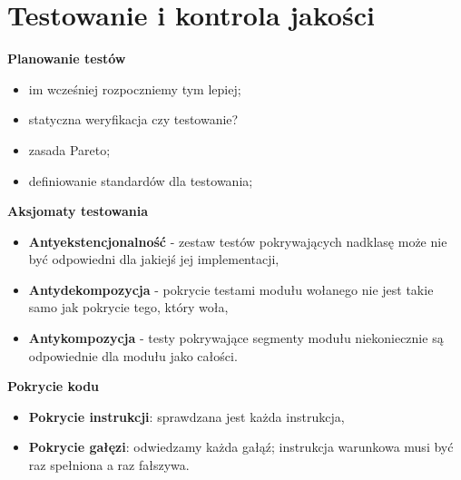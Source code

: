 \documentclass[a4paper]{article}
\begin{document}
    \section{Testowanie i kontrola jakości}

    \textbf{Planowanie testów}
    \begin{itemize}
        \item im wcześniej rozpoczniemy tym lepiej;
        \item statyczna weryfikacja czy testowanie?
        \item zasada Pareto;
        \item definiowanie standardów dla testowania;
    \end{itemize}

    \textbf{Aksjomaty testowania}
    \begin{itemize}
        \item \textbf{Antyekstencjonalność} - zestaw testów pokrywających nadklasę może nie być odpowiedni
        dla jakiejś jej implementacji,
        \item \textbf{Antydekompozycja} - pokrycie testami modułu wołanego nie jest takie samo
        jak pokrycie tego, który woła,
        \item \textbf{Antykompozycja} - testy pokrywające segmenty modułu niekoniecznie są odpowiednie
        dla modułu jako całości.
    \end{itemize}


    \textbf{Pokrycie kodu}
    \begin{itemize}
        \item \textbf{Pokrycie instrukcji}: sprawdzana jest każda instrukcja,
        \item \textbf{Pokrycie gałęzi}: odwiedzamy każda gałąź; instrukcja warunkowa musi być raz spełniona a raz fałszywa.
    \end{itemize}
\end{document}
